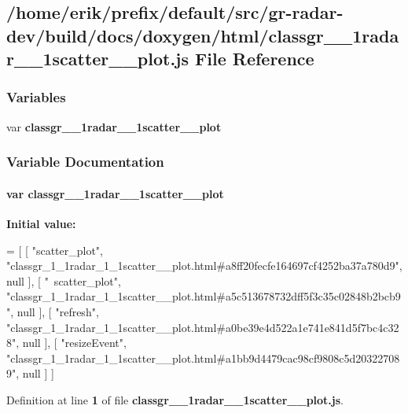 \subsection{/home/erik/prefix/default/src/gr-\/radar-\/dev/build/docs/doxygen/html/classgr\+\_\+\_\+1radar\+\_\+\_\+1scatter\+\_\+\+\_\+plot.js File Reference}
\label{classgr__1__1radar__1__1scatter____plot_8js}
\subsubsection*{Variables}
\begin{DoxyCompactItemize}
\item 
var {\bf classgr\+\_\+\_\+1radar\+\_\+\_\+1scatter\+\_\+\+\_\+plot}
\end{DoxyCompactItemize}


\subsubsection{Variable Documentation}
\paragraph[{classgr\+\_\+1\+\_\+1radar\+\_\+1\+\_\+1scatter\+\_\+\+\_\+plot}]{\setlength{\rightskip}{0pt plus 5cm}var classgr\+\_\+\_\+1radar\+\_\+\_\+1scatter\+\_\+\+\_\+plot}\label{classgr__1__1radar__1__1scatter____plot_8js_ac2fc6c0a0f094ae26de5e49adce015de}
{\bfseries Initial value\+:}
\begin{DoxyCode}
=
[
    [ \textcolor{stringliteral}{"scatter\_plot"}, \textcolor{stringliteral}{"classgr\_1\_1radar\_1\_1scatter\_\_plot.html#a8ff20fecfe164697cf4252ba37a780d9"}, null ],
    [ \textcolor{stringliteral}{"~scatter\_plot"}, \textcolor{stringliteral}{"classgr\_1\_1radar\_1\_1scatter\_\_plot.html#a5c513678732dff5f3c35c02848b2bcb9"}, null ],
    [ \textcolor{stringliteral}{"refresh"}, \textcolor{stringliteral}{"classgr\_1\_1radar\_1\_1scatter\_\_plot.html#a0be39e4d522a1e741e841d5f7bc4c328"}, null ],
    [ \textcolor{stringliteral}{"resizeEvent"}, \textcolor{stringliteral}{"classgr\_1\_1radar\_1\_1scatter\_\_plot.html#a1bb9d4479cac98cf9808c5d203227089"}, null ]
]
\end{DoxyCode}


Definition at line {\bf 1} of file {\bf classgr\+\_\+\_\+1radar\+\_\+\_\+1scatter\+\_\+\+\_\+plot.\+js}.

